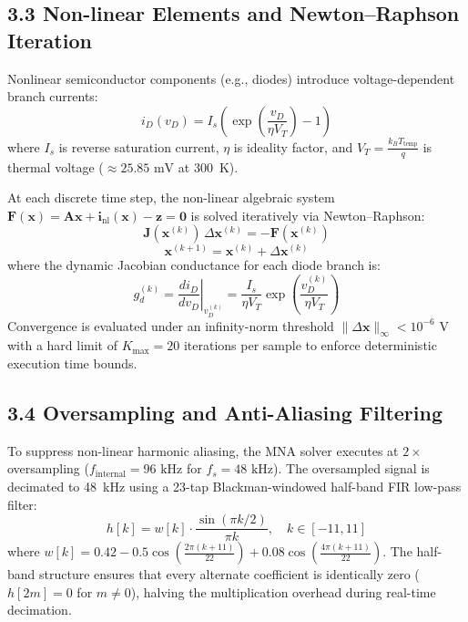 \documentclass[fleqn,draft]{jaes}
\begin{document}
\subsection{3.3 Non-linear Elements and Newton--Raphson Iteration}
Nonlinear semiconductor components (e.g., diodes) introduce voltage-dependent branch currents:
\begin{equation}
i_D(v_D) = I_s \left( \exp\left(\frac{v_D}{\eta V_T}\right) - 1 \right)
\end{equation}
where $I_s$ is reverse saturation current, $\eta$ is ideality factor, and $V_T = \frac{k_B T_{\text{temp}}}{q}$ is thermal voltage ($\approx 25.85\text{ mV}$ at 300~K).

At each discrete time step, the non-linear algebraic system $\mathbf{F}(\mathbf{x}) = \mathbf{A}\mathbf{x} + \mathbf{i}_{\text{nl}}(\mathbf{x}) - \mathbf{z} = \mathbf{0}$ is solved iteratively via Newton--Raphson:
\begin{equation}
\mathbf{J}(\mathbf{x}^{(k)}) \, \Delta \mathbf{x}^{(k)} = -\mathbf{F}(\mathbf{x}^{(k)})
\end{equation}
\begin{equation}
\mathbf{x}^{(k+1)} = \mathbf{x}^{(k)} + \Delta \mathbf{x}^{(k)}
\end{equation}
where the dynamic Jacobian conductance for each diode branch is:
\begin{equation}
g_d^{(k)} = \left. \frac{di_D}{dv_D} \right|_{v_D^{(k)}} = \frac{I_s}{\eta V_T} \exp\left(\frac{v_D^{(k)}}{\eta V_T}\right)
\end{equation}
Convergence is evaluated under an infinity-norm threshold $\|\Delta \mathbf{x}\|_\infty < 10^{-6}\text{ V}$ with a hard limit of $K_{\text{max}} = 20$ iterations per sample to enforce deterministic execution time bounds.

\subsection{3.4 Oversampling and Anti-Aliasing Filtering}
To suppress non-linear harmonic aliasing, the MNA solver executes at $2\times$ oversampling ($f_{\text{internal}} = 96\text{ kHz}$ for $f_s = 48\text{ kHz}$). The oversampled signal is decimated to 48~kHz using a 23-tap Blackman-windowed half-band FIR low-pass filter:
\begin{equation}
h[k] = w[k] \cdot \frac{\sin(\pi k / 2)}{\pi k}, \quad k \in [-11, 11]
\end{equation}
where $w[k] = 0.42 - 0.5 \cos\left(\frac{2\pi(k+11)}{22}\right) + 0.08 \cos\left(\frac{4\pi(k+11)}{22}\right)$. The half-band structure ensures that every alternate coefficient is identically zero ($h[2m] = 0$ for $m \neq 0$), halving the multiplication overhead during real-time decimation.
\end{document}
